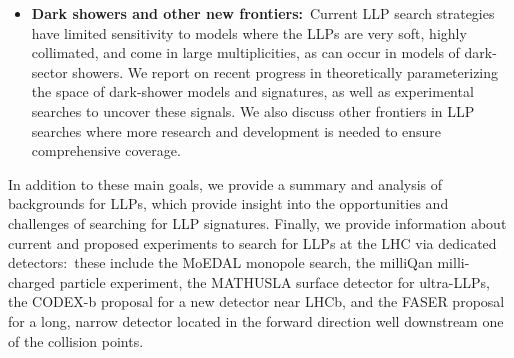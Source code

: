 \begin{itemize}
\item {\bf Dark showers and other new frontiers:}~Current LLP search strategies have limited sensitivity to models where the LLPs are very soft, highly collimated, and come in large multiplicities, as can occur in models of dark-sector showers. We report on recent progress in theoretically parameterizing the space of dark-shower models and signatures, as well as experimental searches to uncover these signals. We also discuss other frontiers in LLP searches where more research and development is needed to ensure comprehensive coverage.

\end{itemize}
%
In addition to these main goals, we provide a summary and analysis of backgrounds for LLPs, which provide insight into the opportunities and challenges of searching for LLP signatures. Finally, we provide information about current and proposed experiments to search for LLPs at the LHC via dedicated detectors:~these include the MoEDAL monopole search, the milliQan milli-charged particle experiment, the MATHUSLA surface detector for ultra-LLPs, the CODEX-b proposal for a new detector near LHCb, and the FASER proposal for a long, narrow detector located in the forward direction well downstream one of the collision points.





